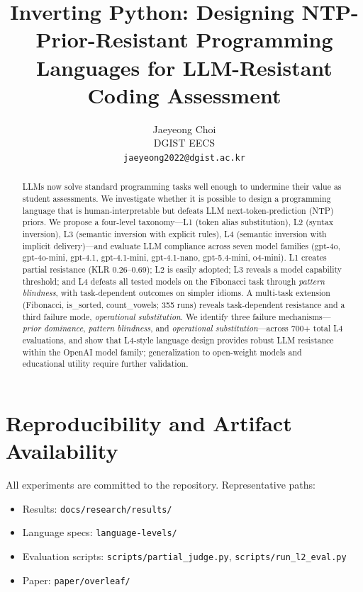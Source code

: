 \documentclass[11pt,a4paper]{article}
\title{Inverting Python: Designing NTP-Prior-Resistant Programming Languages for LLM-Resistant Coding Assessment}
\author{Jaeyeong Choi \\
  DGIST EECS \\
  \texttt{jaeyeong2022@dgist.ac.kr}}
\begin{document}
\maketitle

\begin{abstract}
LLMs now solve standard programming tasks well enough to undermine their value as student assessments.
We investigate whether it is possible to design a programming language that is human-interpretable but defeats LLM next-token-prediction (NTP) priors.
We propose a four-level taxonomy---L1 (token alias substitution), L2 (syntax inversion), L3 (semantic inversion with explicit rules), L4 (semantic inversion with implicit delivery)---and evaluate LLM compliance across seven model families (gpt-4o, gpt-4o-mini, gpt-4.1, gpt-4.1-mini, gpt-4.1-nano, gpt-5.4-mini, o4-mini).
L1 creates partial resistance (KLR 0.26--0.69); L2 is easily adopted; L3 reveals a model capability threshold; and L4 defeats all tested models on the Fibonacci task through \emph{pattern blindness}, with task-dependent outcomes on simpler idioms.
A multi-task extension (Fibonacci, is\_sorted, count\_vowels; 355 runs) reveals task-dependent resistance and a third failure mode, \emph{operational substitution}.
We identify three failure mechanisms---\emph{prior dominance}, \emph{pattern blindness}, and \emph{operational substitution}---across 700+ total L4 evaluations, and show that L4-style language design provides robust LLM resistance within the OpenAI model family; generalization to open-weight models and educational utility require further validation.
\end{abstract}













\section{Reproducibility and Artifact Availability}
All experiments are committed to the repository. Representative paths:
\begin{itemize}
  \item Results: \texttt{docs/research/results/}
  \item Language specs: \texttt{language-levels/}
  \item Evaluation scripts: \texttt{scripts/partial\_judge.py}, \texttt{scripts/run\_l2\_eval.py}
  \item Paper: \texttt{paper/overleaf/}
\end{itemize}



\end{document}
